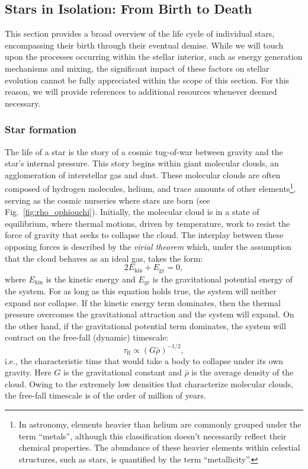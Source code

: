 \documentclass[main.tex]{subfiles}
\begin{document}
    
    \subsection{Stars in Isolation: From Birth to Death}
    This section provides a broad overview of the life cycle of individual stars, encompassing their birth through their eventual demise. While we will touch upon the processes occurring within the stellar interior, such as energy generation mechanisms and mixing, the significant impact of these factors on stellar evolution cannot be fully appreciated within the scope of this section. For this reason, we will provide references to additional resources whenever deemed necessary.
    
    \subsubsection{Star formation}
    The life of a star is the story of a cosmic tug-of-war between gravity and the star's internal pressure. This story begins within giant molecular clouds, an agglomeration of interstellar gas and dust. These molecular clouds are often composed of hydrogen molecules, helium, and trace amounts of other elements\footnote{In astronomy, elements heavier than helium are commonly grouped under the term ``metals'', although this classification doesn't necessarily reflect their chemical properties. The abundance of these heavier elements within celestial structures, such as stars, is quantified by the term ``metallicity''.}, serving as the cosmic nurseries where stars are born (see Fig.~\ref{fig:rho_ophiouchi}).
    Initially, the molecular cloud is in a state of equilibrium, where thermal motions, driven by temperature, work to resist the force of gravity that seeks to collapse the cloud. The interplay between these opposing forces is described by the \textit{virial theorem} which, under the assumption that the cloud behaves as an ideal gas, takes the form:
    \begin{equation}\label{eq:virial}
        2E_\mathrm{kin} + E_\mathrm{gr} = 0,
    \end{equation}
    where $E_\mathrm{kin}$ is the kinetic energy and $E_\mathrm{gr}$ is the gravitational potential energy of the system. For as long as this equation holds true, the system will neither expand nor collapse. If the kinetic energy term dominates, then the thermal pressure overcomes the gravitational attraction and the system will expand. On the other hand, if the gravitational potential term dominates, the system will contract on the free-fall (dynamic) timescale:
    \begin{equation}\label{eq:dynamical_timescale}
        \tau_\mathrm{ff} \propto (G\bar{\rho})^{-1/2},
    \end{equation}
    i.e., the characteristic time that would take a body to collapse under its own gravity. Here $G$ is the gravitational constant and $\bar{\rho}$ is the average density of the cloud. Owing to the extremely low densities that characterize molecular clouds, the free-fall timescale is of the order of million of years.
\end{document}
